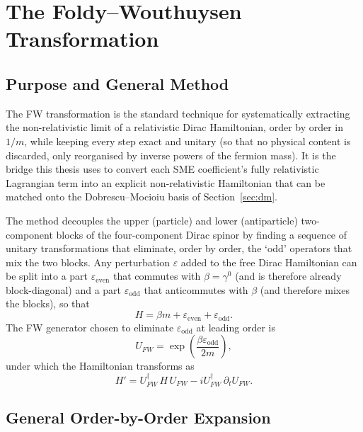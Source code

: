 \documentclass[main]{subfiles}
\begin{document}
\section{The Foldy--Wouthuysen Transformation}
\label{sec:fw}

\subsection{Purpose and General Method}

The FW transformation \cite{Foldy1950} is the standard technique for
systematically extracting the non-relativistic limit of a relativistic
Dirac Hamiltonian, order by order in $1/m$, while keeping every step exact
and unitary (so that no physical content is discarded, only reorganised by
inverse powers of the fermion mass). It is the bridge this thesis uses to
convert each SME coefficient's fully relativistic Lagrangian term into an
explicit non-relativistic Hamiltonian that can be matched onto the
Dobrescu--Mocioiu basis of Section~\ref{sec:dm}.

The method decouples the upper (particle) and lower (antiparticle)
two-component blocks of the four-component Dirac spinor by finding a
sequence of unitary transformations that eliminate, order by order, the
`odd' operators that mix the two blocks. Any perturbation $\varepsilon$ added
to the free Dirac Hamiltonian can be split into a part $\varepsilon_{\text{even}}$
that commutes with $\beta=\gamma^0$ (and is therefore already block-diagonal)
and a part $\varepsilon_{\text{odd}}$ that anticommutes with $\beta$ (and
therefore mixes the blocks), so that
\begin{equation}
  H = \beta m + \varepsilon_{\text{even}} + \varepsilon_{\text{odd}}.
\end{equation}
The FW generator chosen to eliminate $\varepsilon_{\text{odd}}$ at leading
order is
\begin{equation}
  U_{FW} = \exp\!\left(\frac{\beta\varepsilon_{\text{odd}}}{2m}\right),
\end{equation}
under which the Hamiltonian transforms as
\begin{equation}
  H' = U_{FW}^\dagger\, H\, U_{FW} - iU_{FW}^\dagger\,\partial_t U_{FW}.
\end{equation}

\subsection{General Order-by-Order Expansion}
\end{document}

